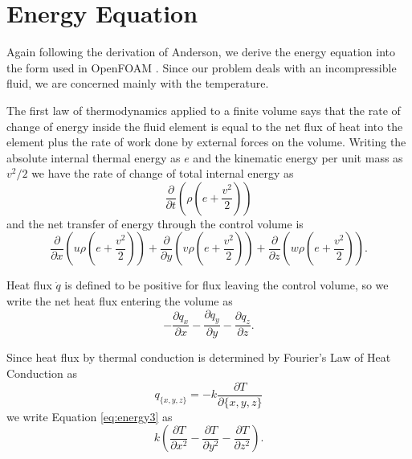 \section{Energy Equation}

Again following the derivation of Anderson, we derive the energy equation into the form used in OpenFOAM .
Since our problem deals with an incompressible fluid, we are concerned mainly with the temperature.

The first law of thermodynamics applied to a finite volume says that the rate of change of energy inside the fluid element is equal to the net flux of heat into the element plus the rate of work done by external forces on the volume.
Writing the absolute internal thermal energy as $e$ and the kinematic energy per unit mass as $v^2/2$ we have the rate of change of total internal energy as
\begin{equation} \frac{\partial}{\partial t} \left ( \rho \left ( e + \frac{v^2}{2} \right ) \right ) \label{eq:energy1} \end{equation}
and the net transfer of energy through the control volume is
\begin{equation} \frac{\partial}{\partial x} \left ( u \rho \left ( e + \frac{v^2}{2} \right ) \right ) + \frac{\partial}{\partial y} \left ( v \rho \left ( e + \frac{v^2}{2} \right ) \right ) + \frac{\partial}{\partial z} \left ( w \rho \left ( e + \frac{v^2}{2} \right ) \right ) \label{eq:energy2} .\end{equation}

Heat flux $\dot{q}$ is defined to be positive for flux leaving the control volume, so we write the net heat flux entering the volume as
\begin{equation} - \frac{\partial q_x}{\partial x} - \frac{\partial q_y}{\partial y} - \frac{\partial q_z}{\partial z} \label{eq:energy3}.\end{equation}

Since heat flux by thermal conduction is determined by Fourier's Law of Heat Conduction as
\begin{equation} q_{\{x,y,z\}} = -k \frac{\partial T}{\partial \{x,y,z\}} \label{eq:energy6} \end{equation}
we write Equation \ref{eq:energy3} as
\begin{equation} k\left ( \frac{\partial T}{\partial x^2} - \frac{\partial T}{\partial y^2} - \frac{\partial T}{\partial z^2} \label{eq:energy5} \right ).\end{equation}

